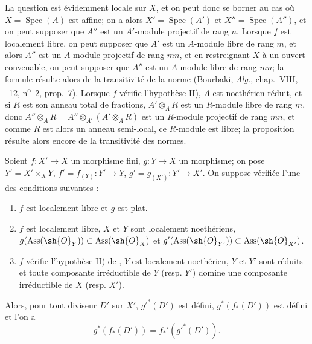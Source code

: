 La question est évidemment locale sur $X$, et on peut donc se borner au cas où $X=\operatorname{Spec}(A)$ est affine;
on a alors $X'=\operatorname{Spec}(A')$ et $X''=\operatorname{Spec}(A'')$, et on peut supposer que $A''$ est un $A'$-module projectif de rang $n$.
Lorsque $f$ est localement libre, on peut supposer que $A'$ est un $A$-module libre de rang $m$, et alors $A''$ est un $A$-module projectif de rang $mn$, et en restreignant $X$ à un ouvert convenable, on peut supposer que $A''$ est un $A$-module libre de rang $mn$;
la formule  résulte alors de la transitivité de la norme (Bourbaki, \emph{Alg.}, chap.~VIII, \textsection~12, n\textsuperscript{o}~2, prop.~7).
Lorsque $f$ vérifie l'hypothèse II), $A$ est noethérien réduit, et si $R$ est son anneau total de fractions, $A'\otimes_A R$ est un $R$-module libre de rang $m$, donc $A''\otimes_A R=A''\otimes_{A'}(A'\otimes_A R)$ est un $R$-module projectif de rang $mn$, et comme $R$ est alors un anneau semi-local, ce $R$-module est libre;
la proposition résulte alors encore de la transitivité des normes.

\begin{proposition}[21.5.8]
\label{IV.21.5.8}
Soient $f:X'\to X$ un morphisme fini, $g:Y\to X$ un morphisme;
on pose $Y'=X'\times_XY$, $f'=f_{(Y)}:Y'\to Y$, $g'=g_{(X')}:Y'\to X'$.
On suppose vérifiée l'une des conditions suivantes :
\begin{enumerate}[label=(\roman*)]
  \item $f$ est localement libre et $g$ est plat.
  \item $f$ est localement libre, $X$ et $Y$ sont localement noethériens, $g(\operatorname{Ass}(\sh{O}_Y))\subset\operatorname{Ass}(\sh{O}_X)$ et $g'(\operatorname{Ass}(\sh{O}_{Y'}))\subset\operatorname{Ass}(\sh{O}_{X'})$.
  \item $f$ vérifie l'hypothèse II) de , $Y$ est localement noethérien, $Y$ et $Y'$ sont réduits et toute composante irréductible de $Y$ (resp. $Y'$) domine une composante irréductible de $X$ (resp. $X'$).
\end{enumerate}
Alors, pour tout diviseur $D'$ sur $X'$, $g'^*(D')$ est défini, $g^*(f_*(D'))$ est défini et l'on a
\[
\label{IV.21.5.8.1}
  g^*(f_*(D'))=f_*'(g'^*(D')).
  \tag{21.5.8.1}
\]
\end{proposition}


